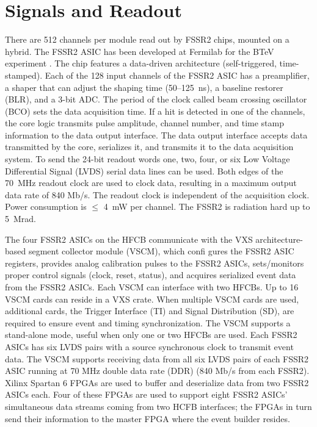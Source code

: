 \section{Signals and Readout}

There are 512 channels per module read out by FSSR2 chips, mounted on a hybrid. The FSSR2 ASIC has been developed at Fermilab for the BTeV experiment \cite{FSSR}. The chip features a data-driven architecture (self-triggered, time-stamped). Each of the 128 input channels of the FSSR2 ASIC has a preamplifier, a shaper that can adjust the shaping time (50--125~ns), a baseline restorer (BLR), and a 3-bit ADC. The period of the clock called beam crossing oscillator (BCO) sets the data acquisition time. If a hit is detected in one of the channels, the core logic transmits pulse amplitude, channel number, and time stamp information to the data output interface. The data output interface accepts data transmitted by the core, serializes it, and transmits it to the data acquisition system. To send the 24-bit readout words one, two, four, or six Low Voltage Differential Signal (LVDS) serial data lines can be used. Both edges of the 70~MHz readout clock are used to clock data, resulting in a maximum output data rate of 840 Mb/s. The readout clock is independent of the acquisition clock. Power consumption is $\le$ 4~mW per channel. The FSSR2 is radiation hard up to 5~Mrad. 

The four FSSR2 ASICs on the HFCB communicate with the VXS architecture-based segment collector module (VSCM), which confi gures the FSSR2 ASIC registers, provides analog calibration pulses to the FSSR2 ASICs, sets/monitors proper control signals (clock, reset, status), and acquires serialized event data from the FSSR2 ASICs. Each VSCM can interface with two HFCBs. Up to 16 VSCM cards can reside in a VXS crate. When multiple VSCM cards are used, additional cards, the Trigger Interface (TI) and Signal Distribution (SD), are required to ensure event and timing synchronization. The VSCM supports a stand-alone mode, useful when only one or two HFCBs are used. Each FSSR2 ASICs has six LVDS pairs with a source synchronous clock to transmit event data. The VSCM supports receiving data from all six LVDS pairs of each FSSR2 ASIC running at 70 MHz double data rate (DDR) (840 Mb/s from each FSSR2). Xilinx Spartan 6 FPGAs are used to buffer and deserialize data from two FSSR2 ASICs each. Four of these FPGAs are used to support eight FSSR2 ASICs' simultaneous data streams coming from two HCFB interfaces; the FPGAs in turn send their information to the master FPGA where the event builder resides.

